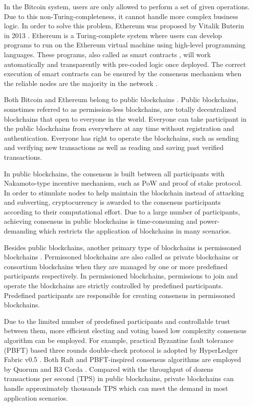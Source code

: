 \documentclass[journal]{IEEEtran}
\begin{document}
{
\color{red}
In the Bitcoin system, users are only allowed to perform a set of given operations. Due to this non-Turing-completeness, it cannot handle more complex business logic. In order to solve this problem, Ethereum was proposed by Vitalik Buterin in 2013 \cite{VButerin}. Ethereum is a Turing-complete system where users can develop programs to run on the Ethereum virtual machine using high-level programming languages. These programs, also called as smart contracts \cite{NSzabo}, will work automatically and transparently with pre-coded logic once deployed. The correct execution of smart contracts can be ensured by the consensus mechanism when the reliable nodes are the majority in the network \cite{VButerin}.


Both Bitcoin and Ethereum belong to public blockchains \cite{VButerin2}. Public blockchains, sometimes referred to as permission-less blockchains, are totally decentralized blockchains that open to everyone in the world. Everyone can take participant in the public blockchains from everywhere at any time without registration and authentication. Everyone has right to operate the blockchains, such as sending and verifying new transactions as well as reading and saving past verified transactions. 

In public blockchains, the consensus is built between all participants with  Nakamoto-type incentive mechanism, such as PoW and proof of stake \cite{POS
} protocol. In order to stimulate nodes to help maintain the blockchain instead of attacking and subverting, cryptocurrency is awarded to the consensus participants according to their computational effort. Due to a large number of participants, achieving consensus in public blockchains is time-consuming and power-demanding which restricts the application of blockchains in many scenarios. 

Besides public blockchains, another primary type of blockchains is permissoned blockchains \cite{MVukoli}. Permissoned blockchains are also called as private blockchains or consortium blockchains when they are managed by one or more predefined participants respectively. In permissioned blockchains,  permissions to join and operate the blockchains are strictly controlled by predefined participants. Predefined participants are responsible for creating consensus in permissoned blockchains. 

Due to the limited number of predefined participants and controllable trust between them, more efficient electing and voting based low complexity consensus algorithm can be employed. For example,  practical Byzantine fault tolerance (PBFT) \cite{MCastro} based three rounds double-check protocol is adopted by HyperLedger Fabric v0.5 \cite{CCachin}. Both Raft \cite{DOngaro} and PBFT-inspired consensus algorithms are employed by Quorum \cite{Quorum} and R3 Corda \cite{RGBrown}. Compared with the throughput of dozens transactions per second (TPS) in public blockchains, private blockchains can handle approximately thousands TPS \cite{TTADinh} which can meet the demand in most application scenarios.}
\end{document}
